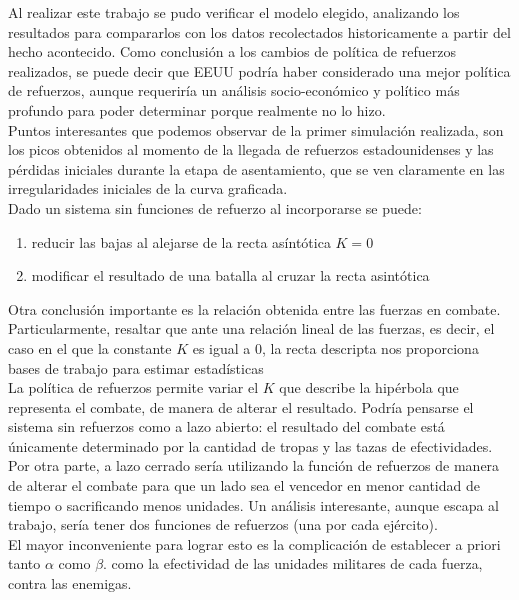 \documentclass{sig-alternate}
\begin{document}
Al realizar este trabajo se pudo verificar el modelo elegido, analizando los resultados para compararlos con los datos recolectados historicamente
a partir del hecho acontecido. Como conclusión a los cambios de política de refuerzos realizados, se puede decir que EEUU podría haber considerado una
mejor política de refuerzos, aunque requeriría un análisis socio-económico y político más profundo para poder determinar porque realmente no
lo hizo.\\
Puntos interesantes que podemos observar de la primer simulación realizada, son los picos obtenidos al momento de la llegada de refuerzos
estadounidenses y las pérdidas iniciales durante la etapa de asentamiento, que se ven claramente en las irregularidades iniciales de la curva 
graficada.\\
Dado un sistema sin funciones de refuerzo al incorporarse se puede:
\begin{enumerate}
\item reducir las bajas al alejarse de la recta asíntótica $K=0$
\item modificar el resultado de una batalla al cruzar la recta asintótica
\end{enumerate}
Otra conclusión importante es la relación obtenida entre las fuerzas en combate. Particularmente, resaltar que ante una relación lineal de las
fuerzas, es decir, el caso en el que la constante $K$ es igual a $0$, la recta descripta nos proporciona bases de trabajo para estimar estadísticas \\
La política de refuerzos permite variar el $K$ que describe la
hip\'erbola que representa el combate, de manera de alterar el
resultado. Podr\'ia pensarse el sistema sin refuerzos como a lazo
abierto: el resultado del combate está \'unicamente determinado
por la cantidad de tropas y las tazas de efectividades. Por otra
parte, a lazo cerrado ser\'ia utilizando la funci\'on de refuerzos de
manera de alterar el combate para que un lado sea el vencedor en menor
cantidad de tiempo o sacrificando menos unidades. Un análisis interesante, aunque escapa al trabajo, sería tener dos funciones de refuerzos (una por cada ejército). \\
El mayor inconveniente para lograr esto es la complicación de establecer a priori tanto $\alpha$ como $\beta$.
como la efectividad de las unidades militares de cada fuerza, contra las enemigas.
\end{document}
